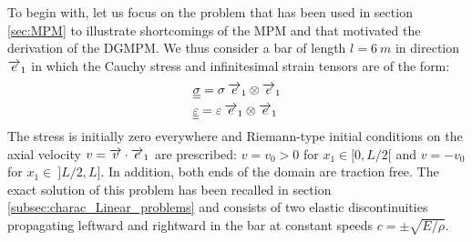 To begin with, let us focus on the problem that has been used in section \ref{sec:MPM} to illustrate shortcomings of the MPM and that motivated the derivation of the DGMPM.
We thus consider a bar of length $l=6\:m$ in direction ${\overrightarrow{e}}_1$ in which the Cauchy stress and infinitesimal strain tensors are of the form:
\begin{align*}
  & {\underline{\underline{\sigma}}} = \sigma \: {\overrightarrow{e}}_1\otimes {\overrightarrow{e}}_1 \\
  & {\underline{\underline{\varepsilon}}} = \varepsilon \: {\overrightarrow{e}}_1\otimes {\overrightarrow{e}}_1
\end{align*}
The stress is initially zero everywhere and Riemann-type initial conditions on the axial velocity $v={\overrightarrow{v}}\cdot{\overrightarrow{e}}_1$ are prescribed: $v=v_0>0$ for $x_1\in [0,L/2[$ and $v=-v_0$ for $x_1\in \:]L/2,L]$. In addition, both ends of the domain are traction free.
The exact solution of this problem \cite[Ch.1]{Wang} has been recalled in section \ref{subsec:charac_Linear_problems} and consists of two elastic discontinuities propagating leftward and rightward in the bar at constant speeds $c=\pm\sqrt{E/\rho}$. 

